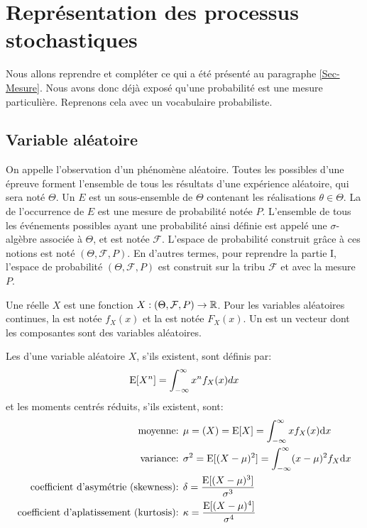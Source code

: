 \medskip
\section{Représentation des processus stochastiques}

Nous allons reprendre et compléter ce qui a été présenté au paragraphe \ref{Sec-Mesure}.
Nous avons donc déjà exposé qu'une probabilité est une mesure particulière.
Reprenons cela avec un vocabulaire probabiliste.

\medskip
\subsection{Variable aléatoire}

On appelle  l'observation d'un phénomène aléatoire.
Toutes les  possibles d'une épreuve forment l'ensemble de tous les résultats d'une expérience aléatoire, qui sera noté $\Theta$. 
Un  $E$ est un sous-ensemble de $\Theta$ contenant les réalisations $\theta\in\Theta$. 
La  de l'occurrence de $E$ est une mesure de probabilité notée $P$.
L'ensemble de tous les événements possibles ayant une probabilité ainsi définie est appelé une $\sigma$-algèbre associée à $\Theta$, et est notée $\mathcal{F}$.
L'espace de probabilité construit grâce à ces notions est noté $(\Theta,\mathcal{F},P)$.
En d'autres termes, pour reprendre la partie I, l'espace de probabilité $(\Theta,\mathcal{F},P)$ est construit sur la tribu $\mathcal{F}$ et avec la mesure $P$.

\medskip
Une  réelle $X$ est une fonction $X : (\Theta,\mathcal{F},P) \rightarrow \mathbb R$. 
Pour les variables aléatoires continues, la  est notée $f_X(x)$ et la  est notée $F_X(x)$.
Un  est un vecteur dont les composantes sont des variables aléatoires.

\medskip
\begin{definition}
Les  d'une variable aléatoire $X$, s'ils existent, sont définis par:
\begin{equation}
\operatorname{E}[X^n] = \displaystyle\int_{-\infty}^\infty x^nf_X(x)dx
\end{equation}
et les moments centrés réduits, s'ils existent, sont:
\begin{align}
\text{moyenne: } & \mu = \left(X\right) = \operatorname{E}[X] = \displaystyle\int_{-\infty}^\infty xf_X(x) \text{d} x  \\
\text{variance: } & \sigma^2 = \operatorname{E}[(X-\mu)^2] = \displaystyle\int_{-\infty}^\infty (x-\mu)^2f_X \text{d} x \\
\text{coefficient d'asymétrie (skewness): } & \delta = \dfrac{\operatorname{E}[(X-\mu)^3]}{\sigma^3} \\
\text{coefficient d'aplatissement (kurtosis): } & \kappa = \dfrac{\operatorname{E}[(X-\mu)^4]}{\sigma^4}
\end{align}
\end{definition}

